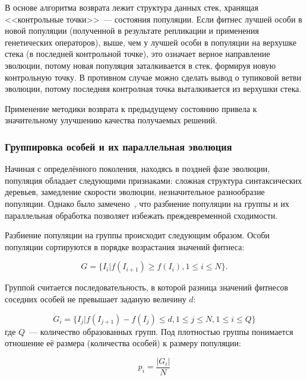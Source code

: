 В основе алгоритма возврата лежит структура данных стек, хранящая <<контрольные точки>>~--- состояния популяции. Если фитнес лучшей особи в новой популяции (полученной в результате репликации и применения генетических операторов), выше, чем у лучшей особи в популяции на верхушке стека (в последней контрольной точке), это означает верное направление эволюции, потому новая популяция заталкивается в стек, формируя новую контрольную точку. В противном случае можно сделать вывод о тупиковой ветви эволюции, потому последняя контролная точка выталкивается из верхушки стека.

Применение методики возврата к предыдущему состоянию привела к значительному улучшению качества получаемых решений.


\subsubsection{Группировка особей и их параллельная эволюция}

Начиная с определённого поколения, находясь в поздней фазе эволюции, популяция обладает следующими признаками: сложная структура синтаксических деревьев, замедление скорости эволюции, незначительное разнообразие популяции. Однако было замечено~\cite{Jiang:2008:MPT:1473248.1474007}, что разбиение популяции на группы и их параллельная обработка позволяет избежать преждевременной сходимости.

Разбиение популяции на группы происходит следующим образом. Особи популяции сортируются в порядке возрастания значений фитнеса:

\begin{equation}
\label{eq:niches_G}
G = \{I_i | f(I_{i+1}) \ge f(I_i), 1 \le i \le N\}.
\end{equation}

Группой считается последовательность, в которой разница значений фитнесов соседних особей не превышает заданую величину $d$:

\begin{equation}
\label{eq:niches_G_i}
G_i = \{I_j | f(I_{j+1}) - f(I_j) \le d, 1 \le j \le N, 1 \le i \le Q\}
\end{equation}
где $Q$~--- количество образованных групп. Под плотностью группы понимается отношение её размера (количества особей) к размеру популяции:

\begin{equation}
\label{eq:niches_p_i}
p_i = \frac{|G_i|}{N}
\end{equation}

